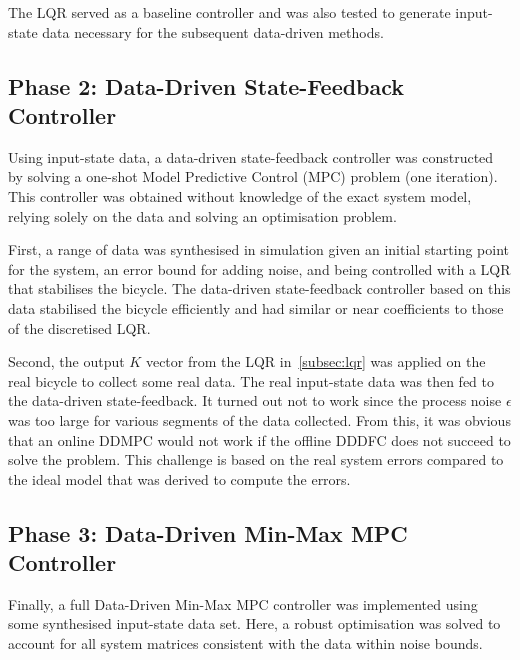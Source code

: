 The LQR served as a baseline controller and was also tested to generate input-state data necessary for the subsequent data-driven methods.

\subsection{Phase 2: Data-Driven State-Feedback Controller}

Using input-state data, a data-driven state-feedback controller was constructed by solving a one-shot Model Predictive Control (MPC) problem (one iteration).
This controller was obtained without knowledge of the exact system model, relying solely on the data and solving an optimisation problem.

First, a range of data was synthesised in simulation given an initial starting point for the system, an error bound for adding noise, and being controlled with a  LQR that stabilises the bicycle. The data-driven state-feedback controller based on this data stabilised the bicycle efficiently and had similar or near coefficients to those of the discretised LQR.

Second, the output $K$ vector from the LQR in~\ref{subsec:lqr} was applied on the real bicycle to collect some real data. The real input-state data was then fed to the data-driven state-feedback. It turned out not to work since the process noise $\epsilon$ was too large for various segments of the data collected. From this, it was obvious that an online DDMPC would not work if the offline DDDFC does not succeed to solve the problem. This challenge is based on the real system errors compared to the ideal model that was derived to compute the errors.


\subsection{Phase 3: Data-Driven Min-Max MPC Controller}

Finally, a full Data-Driven Min-Max MPC controller was implemented using some synthesised input-state data set.
Here, a robust optimisation was solved to account for all system matrices consistent with the data within noise bounds.

